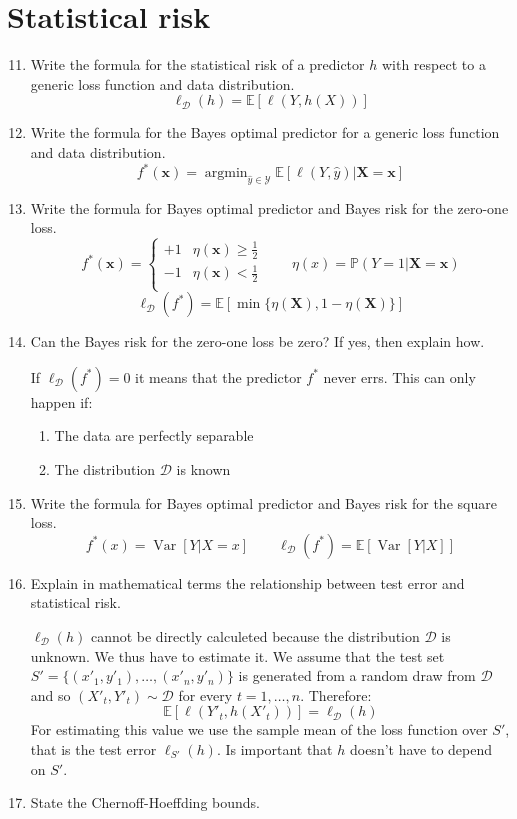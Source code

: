 \documentclass[a4paper]{article}
\newcommand{\Y}{\ensuremath{\mathcal{Y}}}
\newcommand{\D}{\ensuremath{\mathcal{D}}}
\newcommand{\E}{\ensuremath{\mathbb{E}}}
\newcommand{\Prob}{\ensuremath{\mathbb{P}}}
\DeclareMathOperator*{\argmin}{argmin}
\DeclareMathOperator*{\var}{Var}
\begin{document}
\section{Statistical risk}
\begin{enumerate}
    \setcounter{enumi}{10}
    \item Write the formula for the statistical risk of a predictor $h$ with respect to a generic
    loss function and data distribution.
    $$ \ell_\D(h) = \E[\ell(Y,h(X))] $$
    \item Write the formula for the Bayes optimal predictor for a generic loss function and data 
    distribution.
    $$ f^*(\bm x) = \argmin_{\hat{y}\in\Y}\E[\ell(Y,\hat{y})|\bm X=\bm x] $$
    \item Write the formula for Bayes optimal predictor and Bayes risk for the zero-one loss.
    $$ f^*(\bm x)=\begin{cases}
        +1 & \eta(\bm x)\geq\frac{1}{2}\\
        -1 & \eta(\bm x)<\frac{1}{2}\\
    \end{cases} \qquad \eta(x)=\Prob(Y=1|\bm{X=x}) $$ \vspace{.7em}
    $$ \ell_\D(f^*) = \E[\min\{\eta(\bm X),1-\eta(\bm X)\}] $$
    \item Can the Bayes risk for the zero-one loss be zero? If yes, then explain how.
        
        If $\ell_\D(f^*)=0$ it means that the predictor $f^*$ never errs. This can only
        happen if:
        \begin{enumerate}
            \item The data are perfectly separable
            \item The distribution $\D$ is known
        \end{enumerate}
    \item Write the formula for Bayes optimal predictor and Bayes risk for the square loss.
    $$ f^*(x) = \var[Y|X=x] \qquad \ell_\D(f^*)=\E[\var[Y|X]]$$
    \item Explain in mathematical terms the relationship between test error and statistical risk.
    
    $\ell_\D(h)$ cannot be directly calculeted because the distribution $\D$ is unknown. We thus
    have to estimate it. We assume that the test set $S'=\{(x'_1,y'_1),\dots,(x'_n,y'_n)\}$
    is generated from a random draw from $\D$
    and so $(X'_t,Y'_t)\sim\D$ for every $t=1,\dots,n$.
    Therefore: $$ \E[\ell(Y'_t,h(X'_t))]=\ell_\D(h) $$ 
    For estimating this value we use the sample mean of the loss function over $S'$, that is the
    test error $\ell_{S'}(h)$. Is important that $h$ doesn't have to depend on $S'$.
    \item State the Chernoff-Hoeffding bounds.
    

\end{enumerate}
\end{document}
